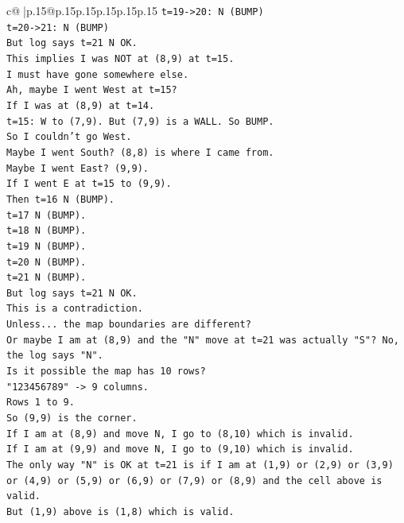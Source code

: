 \documentclass{article}
\begin{document}
{\begin{supertabular}{c@{$\;$}|p{.15\linewidth}@{}p{.15\linewidth}p{.15\linewidth}p{.15\linewidth}p{.15\linewidth}p{.15\linewidth}}
{{{\texttt{t=19{-}>20: N (BUMP)} \\
\texttt{t=20{-}>21: N (BUMP)} \\
\texttt{But log says t=21 N OK.} \\
\texttt{This implies I was NOT at (8,9) at t=15.} \\
\texttt{I must have gone somewhere else.} \\
\texttt{Ah, maybe I went West at t=15?} \\
\texttt{If I was at (8,9) at t=14.} \\
\texttt{t=15: W to (7,9). But (7,9) is a WALL. So BUMP.} \\
\texttt{So I couldn't go West.} \\
\texttt{Maybe I went South? (8,8) is where I came from.} \\
\texttt{Maybe I went East? (9,9).} \\
\texttt{If I went E at t=15 to (9,9).} \\
\texttt{Then t=16 N (BUMP).} \\
\texttt{t=17 N (BUMP).} \\
\texttt{t=18 N (BUMP).} \\
\texttt{t=19 N (BUMP).} \\
\texttt{t=20 N (BUMP).} \\
\texttt{t=21 N (BUMP).} \\
\texttt{But log says t=21 N OK.} \\
\texttt{This is a contradiction.} \\
\texttt{Unless... the map boundaries are different?} \\
\texttt{Or maybe I am at (8,9) and the "N" move at t=21 was actually "S"? No, the log says "N".} \\
\texttt{Is it possible the map has 10 rows?} \\
\texttt{"123456789" {-}> 9 columns.} \\
\texttt{Rows 1 to 9.} \\
\texttt{So (9,9) is the corner.} \\
\texttt{If I am at (8,9) and move N, I go to (8,10) which is invalid.} \\
\texttt{If I am at (9,9) and move N, I go to (9,10) which is invalid.} \\
\texttt{The only way "N" is OK at t=21 is if I am at (1,9) or (2,9) or (3,9) or (4,9) or (5,9) or (6,9) or (7,9) or (8,9) and the cell above is valid.} \\
\texttt{But (1,9) above is (1,8) which is valid.} \\
}}}
\end{supertabular}}
\end{document}
